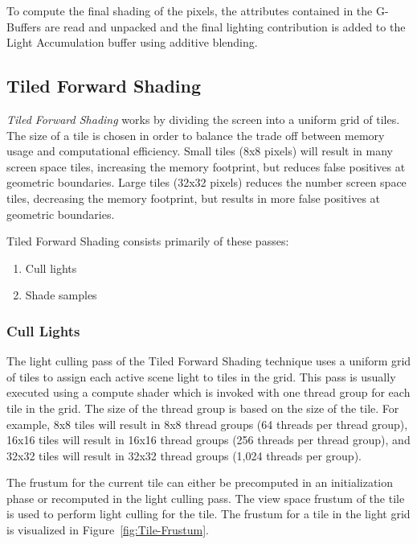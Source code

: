 To compute the final shading of the pixels, the attributes contained in the G-Buffers are read and unpacked and the final lighting contribution is added to the Light Accumulation buffer using additive blending.

\subsection{Tiled Forward Shading}
\label{sec:TiledForwardShading}

\emph{Tiled Forward Shading} \parencite{13_olssonassarsson_2011} works by dividing the screen into a uniform grid of tiles. The size of a tile is chosen in order to balance the trade off between memory usage and computational efficiency. Small tiles (8x8 pixels) will result in many screen space tiles, increasing the memory footprint, but reduces false positives at geometric boundaries. Large tiles (32x32 pixels) reduces the number screen space tiles, decreasing the memory footprint, but results in more false positives at geometric boundaries. 

Tiled Forward Shading consists primarily of these passes:

\begin{enumerate}
\item{Cull lights}
\item{Shade samples}
\end{enumerate}

\subsubsection{Cull Lights}
\label{sec:CullLights}

The light culling pass of the Tiled Forward Shading technique uses a uniform grid of tiles to assign each active scene light to tiles in the grid. This pass is usually executed using a compute shader which is invoked with one thread group for each tile in the grid. The size of the thread group is based on the size of the tile. For example, 8x8 tiles will result in 8x8 thread groups (64 threads per thread group), 16x16 tiles will result in 16x16 thread groups (256 threads per thread group), and 32x32 tiles will result in 32x32 thread groups (1,024 threads per group). 

The frustum for the current tile can either be precomputed in an initialization phase or recomputed in the light culling pass. The view space frustum of the tile is used to perform light culling for the tile. The frustum for a tile in the light grid is visualized in Figure~\ref{fig:Tile-Frustum}.

